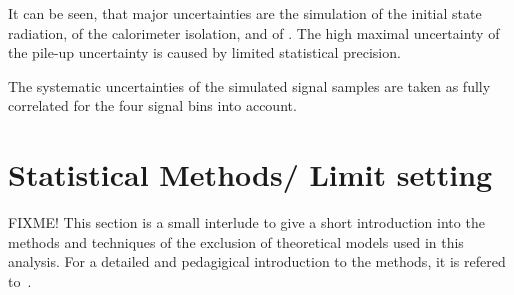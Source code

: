 It can be seen, that major uncertainties are the simulation of the initial state radiation, of the calorimeter isolation, and of \ias.
The high maximal uncertainty of the pile-up uncertainty is caused by limited statistical precision.

The systematic uncertainties of the simulated signal samples are taken as fully correlated for the four signal bins into account.

\section{Statistical Methods/ Limit setting}
FIXME!
This section is a small interlude to give a short introduction into the methods and techniques of the exclusion of theoretical models used in this analysis.
For a detailed and pedagigical introduction to the methods, it is refered to~\cite{bib:Ott_Thesis}.

